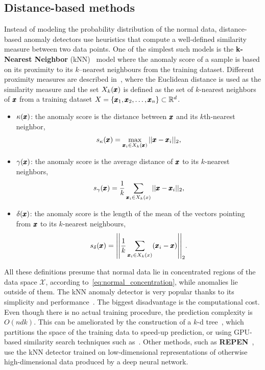 \subsection{Distance-based methods}
Instead of modeling the probability distribution of the normal data, distance-based anomaly detectors use heuristics that compute a well-defined similarity measure between two data points. One of the simplest such models is the \textbf{k-Nearest Neighbor} (kNN)~\cite{ramaswamy2000efficient} model where the anomaly score of a sample is based on its proximity to its $k$--nearest neighbours from the training dataset. Different proximity measures are described in~\cite{harmeling2006outliers}, where 
the Euclidean distance is used as the similarity measure and the set $X_{k}(\pmb{{x}})$ is defined as the set of $k$-nearest neighbors of $\pmb{{x}}$ from a training dataset $X = \lbrace \pmb{{x}}_1, \pmb{{x}}_2, \ldots, \pmb{{x}}_n \rbrace \subset \mathbb{R}^d$.
\begin{itemize}
	\item $\kappa(\pmb{{x}})$: the anomaly score is the distance between $\pmb{{x}}$ and its $k$th-nearest neighbor,
	\begin{equation} \label{eq:knn_kappa}
		s_{\kappa}(\pmb{{x}}) =  \max_{\pmb{{x}}_i \in X_k(\pmb{{x}})} \vert \vert \pmb{{x}} - \pmb{{x}}_i \vert \vert_2,
	\end{equation}
	\item $\gamma(\pmb{{x}})$: the anomaly score is the average distance of $\pmb{{x}}$ to its $k$-nearest neighbors, 
	\begin{equation} \label{eq:knn_gamma}
		s_{\gamma}(\pmb{{x}}) =  \frac{1}{k} \sum_{\pmb{{x}}_i \in X_k(x)} \vert \vert \pmb{{x}} - \pmb{{x}}_i \vert \vert_2,
	\end{equation}
	\item $\delta(\pmb{{x}})$: the anomaly score is the length of the mean of the vectors pointing from $\pmb{{x}}$ to its $k$-nearest neighbours,
	\begin{equation} \label{eq:knn_delta}
		s_{\delta}(\vc{x}) =  \left| \left| \frac{1}{k} \sum_{\vc{x}_i \in X_k(x)} (\vc{x}_i - \vc{x}) \right| \right|_2.
	\end{equation}
\end{itemize}
All these definitions presume that normal data lie in concentrated regions of the data space $\mathcal{X}$, according to~\eqref{eq:normal_concentration}, while anomalies lie outside of them. The kNN anomaly detector is very popular thanks to its simplicity and performance~\cite{campos2016evaluation}. The biggest disadvantage is the computational cost. Even though there is no actual training procedure, the prediction complexity is $O(ndk)$. This can be ameliorated by the construction of a $k$-d tree~\cite{bentley1975multidimensional}, which partitions the space of the training data to speed-up prediction, or using GPU-based similarity search techniques such as~\cite{johnson2019billion}. Other methods, such as \textbf{REPEN}~\cite{pangLearningRepresentationsUltrahighdimensional2018}, use the kNN detector trained on low-dimensional representations of otherwise high-dimensional data produced by a deep neural network.

